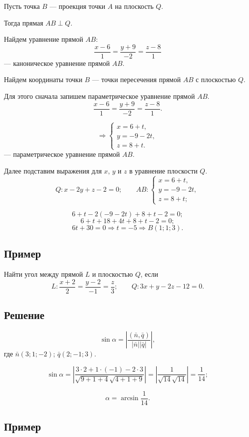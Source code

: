 \documentclass[12pt,a4paper]{article}
\newcommand{\vn}{\bar n}
\newcommand{\vq}{\bar q}
\begin{document}
Пусть точка $B$ --- проекция точки $A$ на плоскость $Q$.

Тогда прямая $AB\perp Q$.

Найдем уравнение прямой $AB$:
$$
\frac{x-6}{1}=\frac{y+9}{-2}=\frac{z-8}{1}
$$
--- каноническое уравнение прямой $AB$.

Найдем координаты точки $B$ --- точки пересечения прямой $AB$ с плоскостью
$Q$.

Для этого сначала запишем параметрическое уравнение прямой $AB$.
$$
\frac{x-6}{1}=\frac{y+9}{-2}=\frac{z-8}{1}.
$$

$$
\Rightarrow
\begin{cases}
x=6+t,\\
y=-9-2t,\\
z=8+t.
\end{cases}
$$
--- параметрическое уравнение прямой $AB$.

Далее подставим выражения для $x$, $y$ и $z$ в уравнение плоскости $Q$.
$$
Q:x-2y+z-2=0;
\qquad
AB:
\begin{cases}
x=6+t,\\
y=-9-2t,\\
z=8+t;
\end{cases}
$$

$$
6+t-2(-9-2t)+8+t-2=0;
$$
$$
6+t+18+4t+8+t-2=0;
$$
$$
6t+30=0\Rightarrow t=-5\Rightarrow B(1;1;3).
$$

\subsection*{\textbf{Пример}}

Найти угол между прямой $L$ и плоскостью $Q$, если
$$
L:\frac{x+2}{2}=\frac{y-2}{-1}=\frac{z}{3};
\qquad
Q:3x+y-2z-12=0.
$$

\subsection*{\textbf{Решение}}

$$
\sin\alpha=\left|\frac{(\vn,\vq)}{|\vn||\vq|}\right|,
$$
где $\vn(3;1;-2)$; $\vq(2;-1;3)$.

$$
\sin\alpha=
\left|
\frac{3\cdot2+1\cdot(-1)-2\cdot3}
{\sqrt{9+1+4}\sqrt{4+1+9}}
\right|
=
\left|\frac1{\sqrt{14}\sqrt{14}}\right|
=
\frac1{14};
$$

$$
\alpha=\arcsin\frac1{14}.
$$

\subsection*{\textbf{Пример}}
\end{document}
